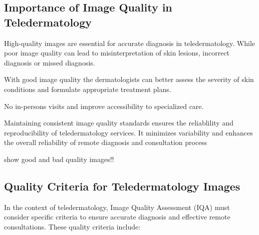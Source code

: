 \subsection{Importance of Image Quality in Teledermatology}
\label{sub:ImportanceIQA_Teledermatology}
High-quality images are essential for accurate diagnosis in teledermatology. While poor image quality can lead to misinterpretation of skin lesions, incorrect diagnosis or missed diagnosis. \par
\vspace{\baselineskip}
\noindent
With good image quality the dermatologists can better assess the severity of skin conditions and formulate appropriate treatment plans.\par
\vspace{\baselineskip}
\noindent
No in-persons visits and improve accessibility to specialized care.\par
\vspace{\baselineskip}
\noindent
Maintaining consistent image quality standards ensures the reliablility and reproducibility of teledermatology services. It minimizes variability and enhances the overall reliability of remote diagnosis and consultation process\par
\vspace{\baselineskip}
\noindent
show good and bad quality images!!\par

\subsection{Quality Criteria for Teledermatology Images}
\label{sub:QualityCriteriaTeledermatology}
In the context of teledermatology, Image Quality Assessment (IQA) must consider specific criteria to ensure accurate diagnosis and effective remote consultations. These quality criteria include:

